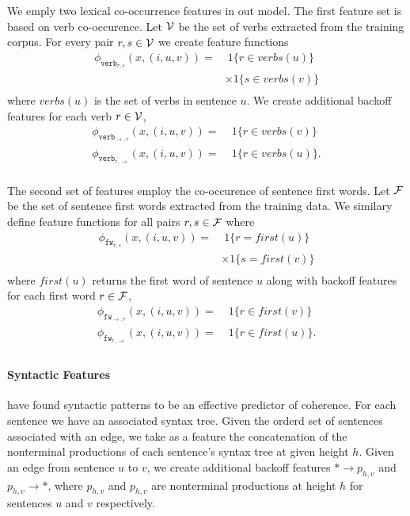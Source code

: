 \documentclass[11pt]{article}
\newcommand{\Verbs}{\cal V}
\newcommand{\Fwords}{\cal F}
\begin{document}
We emply two lexical co-occurrence features in out model. The first feature set is based on verb co-occurence. Let $\Verbs$ be the set of verbs extracted from the training corpus. For every pair $r,s \in \Verbs$ we create feature functions 
\begin{align*}
\phi_{\texttt{verb}_{r,s}}(x, (i, u, v)) = & \; 1\{ r \in verbs(u) \} \\
& \times 1\{s \in verbs(v) \}\\
\end{align*}
where $verbs(u)$ is the set of verbs in sentence $u$.
We create additional backoff features for each verb $r \in \Verbs$,
\begin{align*}
\phi_{\texttt{verb}_{\rightarrow,r}}(x, (i, u, v)) = & \; 1\{ r \in verbs(v)\} \\
\phi_{\texttt{verb}_{r,\rightarrow}}(x, (i, u, v)) = & \; 1\{ r \in verbs(u)\}. \\
\end{align*}


The second set of features employ the co-occurence of sentence first words.
Let $\Fwords$ be the set of sentence first words extracted from the training data.
 We similary define feature functions for all pairs $r,s \in \Fwords$ where
\begin{align*}
\phi_{\texttt{fw}_{r,s}}(x, (i, u, v)) = & \; 1\{ r = first(u) \} \\
& \times 1\{s = first(v) \}\\
\end{align*}
where $first(u)$ returns the first word of sentence $u$ along with backoff features for each first word $r \in \Fwords$,
\begin{align*}
\phi_{\texttt{fw}_{\rightarrow,r}}(x, (i, u, v)) = & \; 1\{ r \in first(v)\} \\
\phi_{\texttt{fw}_{r,\rightarrow}}(x, (i, u, v)) = & \; 1\{ r \in first(u)\}. \\
\end{align*}



\paragraph{Syntactic Features}

 have found syntactic patterns to be an effective predictor of coherence. For each sentence we have an associated syntax tree. Given the orderd set of sentences associated with an edge, we take as a feature the concatenation of the nonterminal productions of each sentence's syntax tree at given height $h$. Given an edge from sentence $u$ to $v$, we create additional backoff features $* \rightarrow p_{h,v}$ and $p_{h,v} \rightarrow *$, where $p_{h,v}$ and $p_{h,v} $ are nonterminal productions at height $h$ for sentences $u$ and $v$ respectively.
\end{document}
